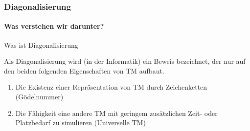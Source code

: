 \begin{frame}
	\frametitle{Diagonalisierung}
	\framesubtitle{Was verstehen wir darunter?}
	\begin{KITinfoblock}{Was ist Diagonalisierung} {
			Als Diagonalisierung wird (in der Informatik) ein Beweis bezeichnet, der nur auf den beiden folgenden
			Eigenschaften von TM aufbaut.
			
			\begin{enumerate}
				\item<2-> Die Existenz einer Repräsentation von TM durch Zeichenketten (Gödelnummer)
				\item<3-> Die Fähigkeit eine andere TM mit geringem zusätzlichen Zeit- oder Platzbedarf zu simulieren (Universelle TM)
			\end{enumerate}		
		}
	\end{KITinfoblock}
	
\end{frame}